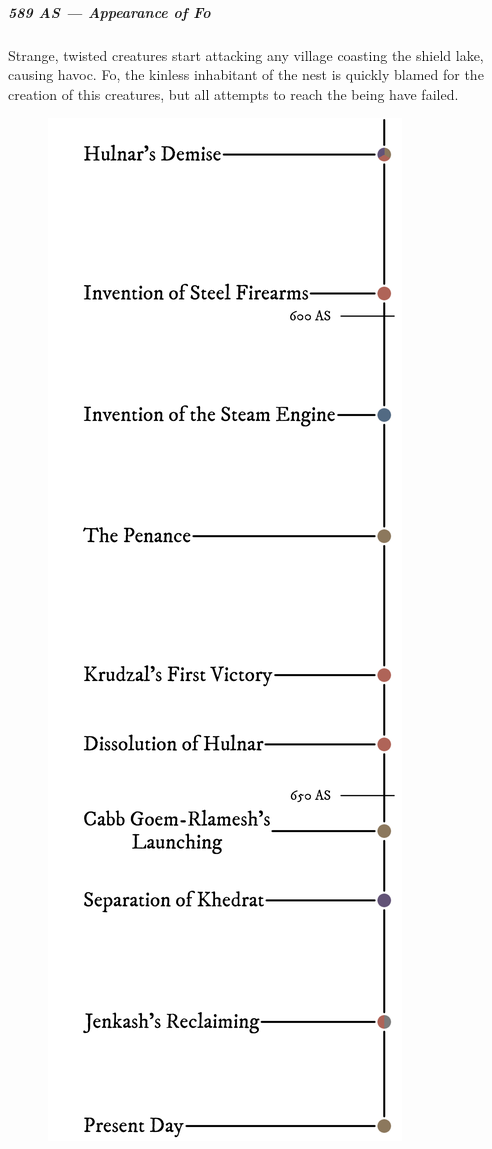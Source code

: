 \subparagraph{589 AS --- Appearance of Fo} Strange, twisted creatures start attacking any village coasting the shield lake, causing havoc.
Fo, the kinless inhabitant of the nest is quickly blamed for the creation of this creatures, but all attempts to reach the being have failed.

\begin{figure}[H]
    \centering \includegraphics{01yuadrem/img/30history_vi.png}
\end{figure}

